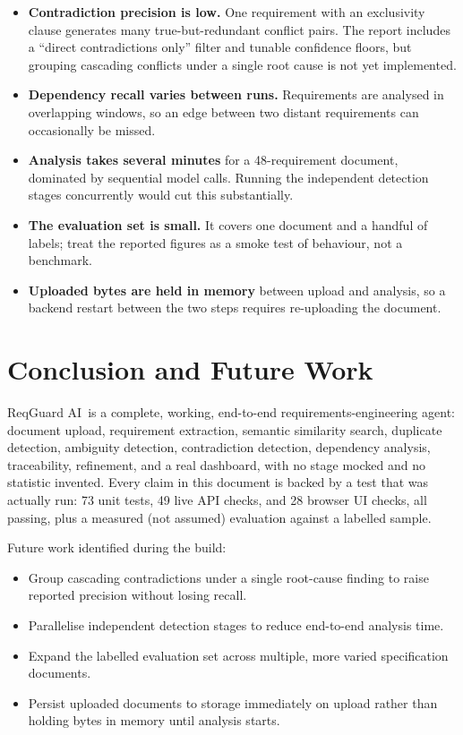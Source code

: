 \documentclass[11pt,a4paper]{article}
\newcommand{\ProjectName}{ReqGuard AI}
\begin{document}
\begin{itemize}[leftmargin=1.4em]
  \item \textbf{Contradiction precision is low.} One requirement with an
        exclusivity clause generates many true-but-redundant conflict
        pairs. The report includes a ``direct contradictions only'' filter
        and tunable confidence floors, but grouping cascading conflicts
        under a single root cause is not yet implemented.
  \item \textbf{Dependency recall varies between runs.} Requirements are
        analysed in overlapping windows, so an edge between two distant
        requirements can occasionally be missed.
  \item \textbf{Analysis takes several minutes} for a 48-requirement
        document, dominated by sequential model calls. Running the
        independent detection stages concurrently would cut this
        substantially.
  \item \textbf{The evaluation set is small.} It covers one document and a
        handful of labels; treat the reported figures as a smoke test of
        behaviour, not a benchmark.
  \item \textbf{Uploaded bytes are held in memory} between upload and
        analysis, so a backend restart between the two steps requires
        re-uploading the document.
\end{itemize}

\section{Conclusion and Future Work}

\ProjectName\ is a complete, working, end-to-end requirements-engineering
agent: document upload, requirement extraction, semantic similarity search,
duplicate detection, ambiguity detection, contradiction detection,
dependency analysis, traceability, refinement, and a real dashboard, with no
stage mocked and no statistic invented. Every claim in this document is
backed by a test that was actually run: 73 unit tests, 49 live API checks,
and 28 browser UI checks, all passing, plus a measured (not assumed)
evaluation against a labelled sample.

Future work identified during the build:

\begin{itemize}[leftmargin=1.4em]
  \item Group cascading contradictions under a single root-cause finding to
        raise reported precision without losing recall.
  \item Parallelise independent detection stages to reduce end-to-end
        analysis time.
  \item Expand the labelled evaluation set across multiple, more varied
        specification documents.
  \item Persist uploaded documents to storage immediately on upload rather
        than holding bytes in memory until analysis starts.
\end{itemize}
\end{document}
